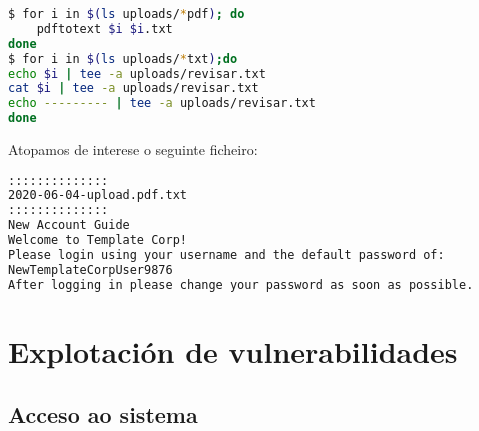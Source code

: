 \documentclass[a4paper]{article}
\begin{document}
        \begin{lstlisting}[language=Bash, caption=pdftotext]
$ for i in $(ls uploads/*pdf); do 
    pdftotext $i $i.txt
done
$ for i in $(ls uploads/*txt);do
echo $i | tee -a uploads/revisar.txt
cat $i | tee -a uploads/revisar.txt
echo --------- | tee -a uploads/revisar.txt
done\end{lstlisting}

Atopamos de interese o seguinte ficheiro:
        \begin{lstlisting}[language=Bash, caption=Contrasinal por defecto]
::::::::::::::
2020-06-04-upload.pdf.txt
::::::::::::::
New Account Guide
Welcome to Template Corp!
Please login using your username and the default password of:
NewTemplateCorpUser9876
After logging in please change your password as soon as possible.\end{lstlisting}

        \section{Explotación de vulnerabilidades}
        \vspace{0.2cm}
        \subsection{Acceso ao sistema}
        \vspace{0.2cm}
\end{document}
